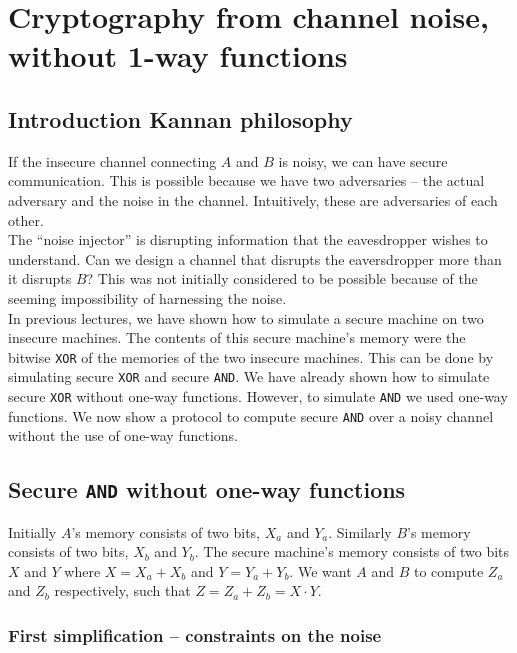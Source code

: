 \documentclass[11pt]{article}
\begin{document}
\section{Cryptography from channel noise, without 1-way functions}

\subsection{Introduction Kannan philosophy}
If the insecure channel connecting $A$ and $B$ is noisy, we can have secure communication.
This is possible because we have two adversaries -- the actual adversary and the noise
in the channel. Intuitively, these are adversaries of each other. \\

The ``noise injector'' is disrupting information that the eavesdropper wishes to understand. Can we design a channel that disrupts the eaversdropper more than it disrupts $B$? This was not initially considered to be  possible because of the seeming impossibility of harnessing the noise. \\

In previous lectures, we have shown how to simulate a secure machine on two insecure machines. The contents of this secure machine's memory were the bitwise \texttt{XOR} of the memories of the two insecure machines. This can be done by simulating secure \texttt{XOR} and secure \texttt{AND}. We have already shown how to simulate secure \texttt{XOR} without one-way functions. However, to simulate \texttt{AND} we used one-way functions. We now show a protocol to compute secure \texttt{AND} over a noisy channel without the use of one-way functions. 

\subsection{Secure \texttt{AND} without one-way functions}

Initially $A$'s memory consists of two bits, $X_a$ and $Y_a$. Similarly $B$'s memory consists of two bits, $X_b$ and  $Y_b$. The secure machine's memory consists of two bits $X$ and $Y$ where $X = X_a + X_b$ and $Y = Y_a + Y_b$. We want $A$ and $B$ to compute $Z_a$ and $Z_b$ respectively, such that $Z = Z_a + Z_b = X \cdot Y$. \\

\subsubsection{First simplification -- constraints on the noise}
\end{document}
